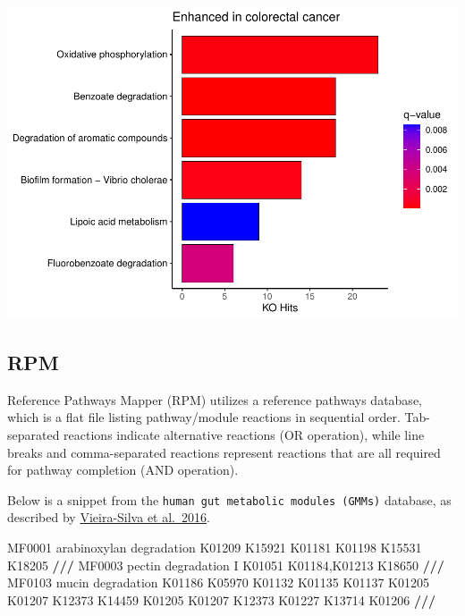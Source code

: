 \documentclass[
]{article}
\newenvironment{Shaded}{\begin{snugshade}}{\end{snugshade}}
\newcommand{\ErrorTok}[1]{\textcolor[rgb]{0.64,0.00,0.00}{\textbf{#1}}}
\newcommand{\NormalTok}[1]{#1}
\newcommand{\SpecialCharTok}[1]{\textcolor[rgb]{0.81,0.36,0.00}{\textbf{#1}}}
\begin{document}
\includegraphics{workshop_files/figure-latex/unnamed-chunk-59-1.pdf}

\hypertarget{rpm}{%
\subsection{RPM}\label{rpm}}

Reference Pathways Mapper (RPM) utilizes a reference pathways database,
which is a flat file listing pathway/module reactions in sequential
order. Tab-separated reactions indicate alternative reactions (OR
operation), while line breaks and comma-separated reactions represent
reactions that are all required for pathway completion (AND operation).

Below is a snippet from the
\texttt{human\ gut\ metabolic\ modules\ (GMMs)} database, as described
by \href{https://www.nature.com/articles/nmicrobiol201688}{Vieira-Silva
et al.~2016}.

\begin{Shaded}
\begin{Highlighting}[]
\NormalTok{MF0001  arabinoxylan degradation}
\NormalTok{K01209  K15921  K01181  K01198  K15531  K18205}
\SpecialCharTok{/}\ErrorTok{//}
\NormalTok{MF0003  pectin degradation I}
\NormalTok{K01051}
\NormalTok{K01184,K01213   K18650}
\SpecialCharTok{/}\ErrorTok{//}
\NormalTok{MF0103  mucin degradation}
\NormalTok{K01186}
\NormalTok{K05970}
\NormalTok{K01132  K01135  K01137  K01205}
\NormalTok{K01207  K12373  K14459}
\NormalTok{K01205  K01207  K12373  K01227  K13714}
\NormalTok{K01206}
\SpecialCharTok{/}\ErrorTok{//}
\end{Highlighting}
\end{Shaded}
\end{document}
